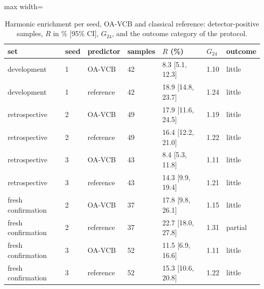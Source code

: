 \begin{table}[tbp]\centering\footnotesize\setlength{\tabcolsep}{4pt}
\caption{Harmonic enrichment per seed, OA-VCB and classical reference: detector-positive samples, $R$ in \% [95\% CI], $G_{24}$, and the outcome category of the protocol.}\label{tab:harmonicseeds}
\begin{adjustbox}{max width=\linewidth}
\begin{tabular}{lllllll}\toprule
set & seed & predictor & samples & $R$ (\%) & $G_{24}$ & outcome \\\midrule
development & 1 & OA-VCB & 42 & 8.3 [5.1, 12.3] & 1.10 & little \\
development & 1 & reference & 42 & 18.9 [14.8, 23.7] & 1.24 & little \\
retrospective & 2 & OA-VCB & 49 & 17.9 [11.6, 24.5] & 1.19 & little \\
retrospective & 2 & reference & 49 & 16.4 [12.2, 21.0] & 1.22 & little \\
retrospective & 3 & OA-VCB & 43 & 8.4 [5.3, 11.8] & 1.11 & little \\
retrospective & 3 & reference & 43 & 14.3 [9.9, 19.4] & 1.21 & little \\
fresh confirmation & 2 & OA-VCB & 37 & 17.8 [9.8, 26.1] & 1.15 & little \\
fresh confirmation & 2 & reference & 37 & 22.7 [18.0, 27.8] & 1.31 & partial \\
fresh confirmation & 3 & OA-VCB & 52 & 11.5 [6.9, 16.6] & 1.11 & little \\
fresh confirmation & 3 & reference & 52 & 15.3 [10.6, 20.8] & 1.22 & little \\
\bottomrule\end{tabular}
\end{adjustbox}
\end{table}
